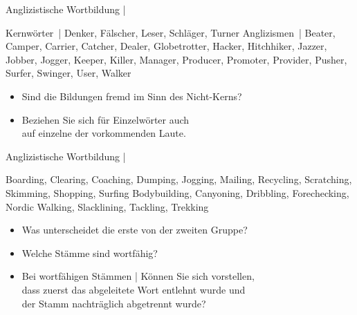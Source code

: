 \begin{frame}
  {Anglizistische Wortbildung | }
  \onslide<+->
  \onslide<+->
  \begin{exe}
    \ex \alert{Kernwörter} | Denker, Fälscher, Leser, Schläger, Turner
    \onslide<+->
    \Zeile
    \ex \alert{Anglizismen} | Beater, Camper, Carrier, Catcher, Dealer, Globetrotter, Hacker, Hitchhiker, Jazzer, Jobber, Jogger, Keeper, Killer, Manager, Producer, Promoter, Provider, Pusher, Surfer, Swinger, User, Walker
  \end{exe}
  \onslide<+->
  \Zeile
  \begin{itemize}[<+->]
    \item Sind die Bildungen \alert{fremd} im Sinn des Nicht-Kerns?
    \item Beziehen Sie sich für Einzelwörter auch\\
      auf einzelne der vorkommenden Laute.
  \end{itemize}
\end{frame}

\begin{frame}
  {Anglizistische Wortbildung | }
  \onslide<+->
  \onslide<+->
  \begin{exe}
    \ex Boarding, Clearing, Coaching, Dumping, Jogging, Mailing, Recycling,
Scratching, Skimming, Shopping, Surfing
    \onslide<+->
    \Halbzeile
    \ex Bodybuilding, Canyoning, Dribbling, Forechecking, Nordic Walking, Slacklining, Tackling, Trekking
  \end{exe}
  \onslide<+->
  \Zeile
  \begin{itemize}[<+->]
    \item Was unterscheidet die erste von der zweiten Gruppe?
    \item Welche Stämme sind \alert{wortfähig}?
    \item Bei wortfähigen Stämmen | Können Sie sich vorstellen,\\
      dass \alert{zuerst das abgeleitete Wort entlehnt wurde} und\\
      der Stamm nachträglich abgetrennt wurde?
  \end{itemize}
\end{frame}

